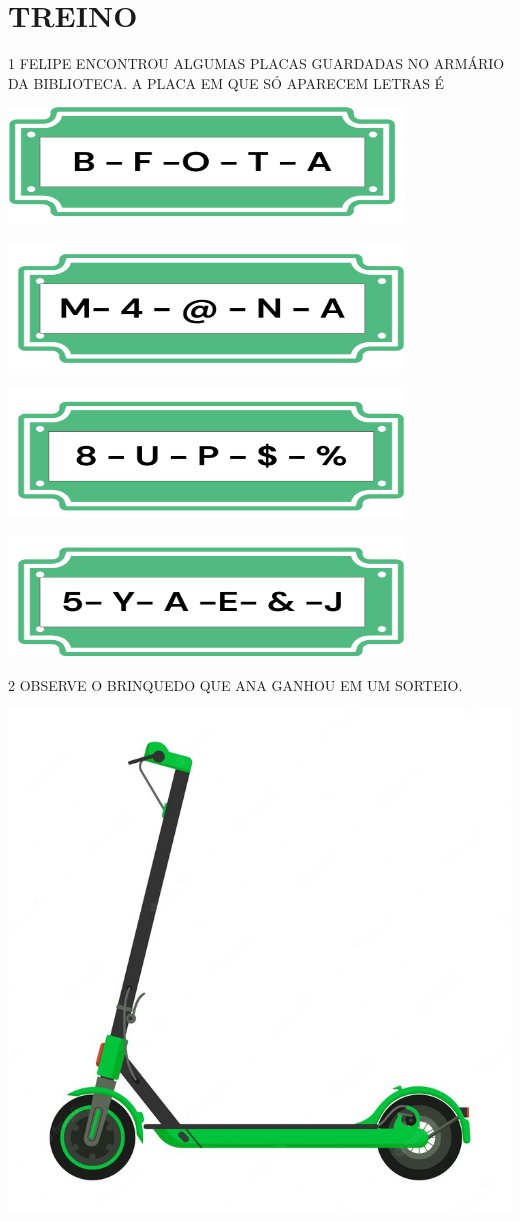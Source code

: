 \pagebreak


\section{TREINO}


\num{1} FELIPE ENCONTROU ALGUMAS PLACAS GUARDADAS NO ARMÁRIO DA BIBLIOTECA. A
PLACA EM QUE SÓ APARECEM LETRAS É

\begin{escolha}
\item \includegraphics[width=.35\textwidth]{media/image82a.png}

\item \includegraphics[width=.35\textwidth]{media/image82b.png}

\item \includegraphics[width=.35\textwidth]{media/image82c.png}

\item \includegraphics[width=.35\textwidth]{media/image82d.png}
\end{escolha}

\num{2} OBSERVE O BRINQUEDO QUE ANA GANHOU EM UM SORTEIO.

\begin{center}
\includegraphics[width=.5\textwidth]{media/image83.png}
\end{center}


